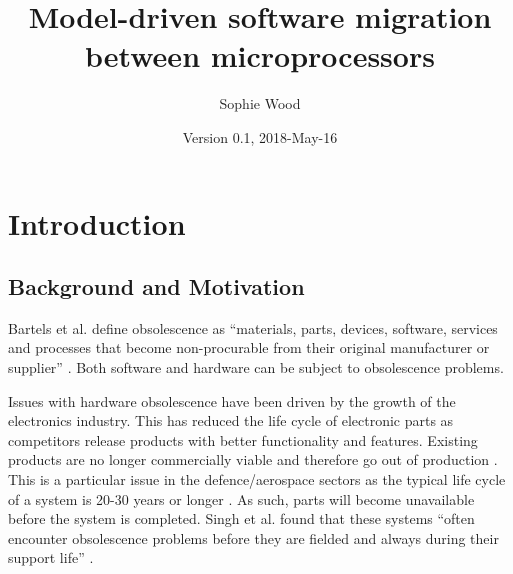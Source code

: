 \documentclass{UoYCSproject}
\author{Sophie Wood}
\title{Model-driven software migration between microprocessors}
\date{Version 0.1, 2018-May-16}
\begin{document}
\maketitle

\chapter{Introduction}
\section{Background and Motivation}
Bartels et al. define obsolescence as ``materials, parts, devices, software, services and processes that become non-procurable from their original manufacturer or supplier'' \parencite{bartels2012strategies}. Both software and hardware can be subject to obsolescence problems. 

Issues with hardware obsolescence have been driven by the growth of the electronics industry. This has reduced the life cycle of electronic parts as competitors release products with better functionality and features. Existing products are no longer commercially viable and therefore go out of production \parencite{bartels2012strategies}. This is a particular issue in the defence/aerospace sectors as the typical life cycle of a system is 20-30 years or longer \parencite{rojo2010obsolescence}. As such, parts will become unavailable before the system is completed. Singh et al. found that these systems ``often encounter obsolescence problems before they are fielded and always during their support life'' \parencite{singh2006obsolescence}.
\end{document}
